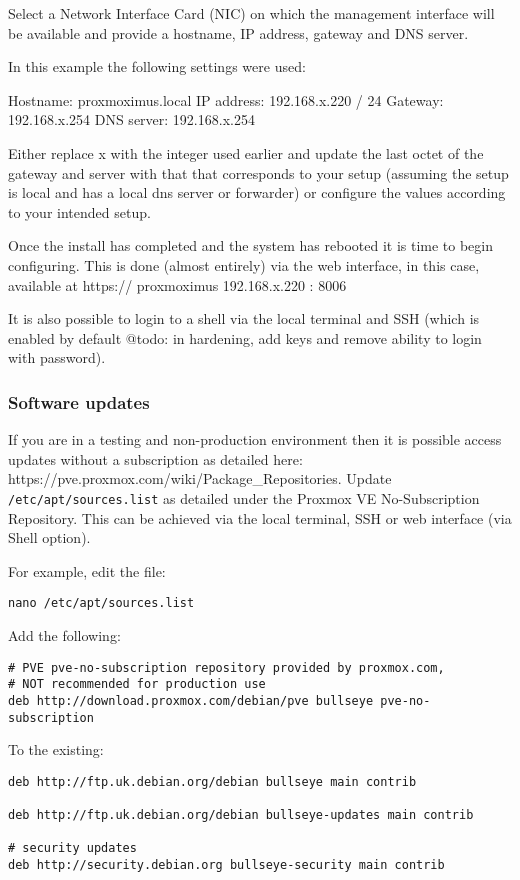 \documentclass[
	11pt, %
	fleqn, %
	a4paper, %
]{LegrandOrangeBook}
\begin{document}
Select a Network Interface Card (NIC) on which the management interface
will be available and provide a hostname, IP address, gateway and DNS
server.

In this example the following settings were used:

Hostname: proxmoximus.local IP address: 192.168.x.220 / 24 Gateway:
192.168.x.254 DNS server: 192.168.x.254

Either replace x with the integer used earlier and update the last octet
of the gateway and server with that that corresponds to your setup
(assuming the setup is local and has a local dns server or forwarder) or
configure the values according to your intended setup.

Once the install has completed and the system has rebooted it is time to
begin configuring. This is done (almost entirely) via the web interface,
in this case, available at https:// proxmoximus \textbar{} 192.168.x.220
: 8006

It is also possible to login to a shell via the local terminal and SSH
(which is enabled by default @todo: in hardening, add keys and remove
ability to login with password).

\hypertarget{software-updates}{%
\subsubsection{Software updates}\label{software-updates}}

If you are in a testing and non-production environment then it is
possible access updates without a subscription as detailed here:
https://pve.proxmox.com/wiki/Package\_Repositories. Update
\texttt{/etc/apt/sources.list} as detailed under the Proxmox VE
No-Subscription Repository. This can be achieved via the local terminal,
SSH or web interface (via Shell option).

For example, edit the file:

\texttt{nano\ /etc/apt/sources.list}

Add the following:

\begin{verbatim}
# PVE pve-no-subscription repository provided by proxmox.com,
# NOT recommended for production use
deb http://download.proxmox.com/debian/pve bullseye pve-no-subscription
\end{verbatim}

To the existing:

\begin{verbatim}
deb http://ftp.uk.debian.org/debian bullseye main contrib

deb http://ftp.uk.debian.org/debian bullseye-updates main contrib

# security updates
deb http://security.debian.org bullseye-security main contrib
\end{verbatim}
\end{document}
